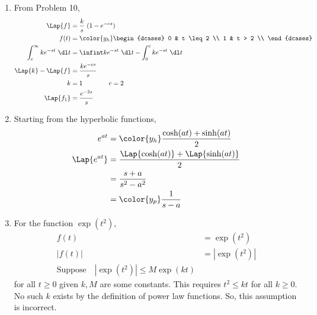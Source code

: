 \begin{enumerate}
      \item From Problem 10,
            \begin{align}
                  \Lap \{f\}                        & = \frac{k}{s}\ (1 - e^{-cs}) \\
                  f(t)                              & = \color{y_h}
                  \begin{dcases}
                        0 & t \leq 2 \\
                        1 & t > 2    \\
                  \end{dcases}                                                    \\
                  \int_{c}^{\infty} ke^{-st}\ \dl t & = \infint ke^{-st}\ \dl t
                  - \int_{0}^{c} ke^{-st}\ \dl t                                   \\
                  \Lap\{k\} - \Lap\{f\}             & = \frac{ke^{-cs}}{s}         \\
                  k                                 & = 1 \qquad \qquad c = 2      \\
                  \Lap\{f_1\}                       & = \frac{e^{-2s}}{s}
            \end{align}
      \item Starting from the hyperbolic functions,
            \begin{align}
                  e^{at}         & = \color{y_h}\frac{\cosh(at) + \sinh(at)}{2}      \\
                  \Lap\{e^{at}\} & = \frac{\Lap\{\cosh(at)\} + \Lap\{\sinh(at)\}}{2} \\
                                 & = \frac{s+a}{s^2 - a^2}                           \\
                                 & = \color{y_p} \frac{1}{s-a}
            \end{align}

      \item For the function $ \exp(t^2) $,
            \begin{align}
                  f(t)   & = \exp(t^2)   \\
                  |f(t)| & = |\exp(t^2)| \\
                  \text{Suppose} \quad |\exp(t^2)| \leq M\exp(kt)
            \end{align}
            for all $ t \geq 0 $ given $ k, M $ are some constants. This requires
            $ t^2 \leq kt $ for all $ k \geq 0 $. No such $ k $ exists by the definition
            of power law functions. So, this assumption is incorrect.


\end{enumerate}
